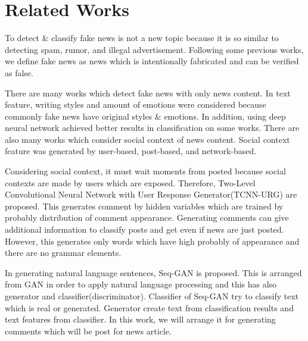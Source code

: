 \section{Related Works}
To detect \& classify fake news is not a new topic because it is so similar to detecting spam\cite{shen2017discovering}, rumor\cite{7023340}, and illegal advertisement\cite{Huang:2017:DFO:3041021.3054233}.
Following some previous works\cite{Shu:2017:FND:3137597.3137600,Ruchansky:2017:CHD:3132847.3132877,Wang:2018:EEA:3219819.3219903}, we define fake news as news which is intentionally fabricated and can be verified as false.

There are many works which detect fake news with only news content.
In text feature, writing styles\cite{DBLP:journals/corr/PotthastKRBS17} and amount of emotions\cite{DBLP:journals/corr/abs-1903-01728}
were considered because commonly fake news have original styles \& emotions.
In addition, using deep neural network achieved better results in classification on some works\cite{wang-2017-liar,karimi-tang-2019-learning,karimi-etal-2018-multi}.
There are also many works which consider social context of news content.
Social context feature was generated by user-based\cite{Castillo:2011:ICT:1963405.1963500,8397048,DBLP:journals/corr/abs-1904-13355}, 
post-based\cite{Yang2019UnsupervisedFN,Tacchini2017SomeLI,AAAI1612128},
and network-based\cite{Wu:2018:TFF:3159652.3159677,DBLP:journals/corr/abs-1902-06673}.

Considering social context, it must wait moments from posted because social contexts are made by users which are exposed.
Therefore,  Two-Level Convolutional Neural Network with User Response Generator(TCNN-URG) are proposed\cite{ijcai2018-533}.
This generates comment by hidden variables which are trained by probably distribution of comment appearance.
Generating comments can give additional information to classify posts and get even if news are just posted.
However, this generates only words which have high probably of appearance and there are no grammar elements.

In generating natural language sentences, Seq-GAN is proposed\cite{AAAI1714344}.
This is arranged from GAN in order to apply natural language processing and this has also generator and classifier(discriminator).
Classifier of Seq-GAN try to classify text which is real or generated.
Generator create text from classification results and text features from classifier.
In this work, we will arrange it for generating comments which will be post for news article.